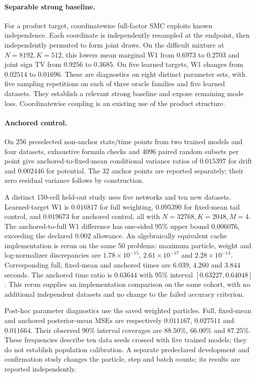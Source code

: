 \paragraph{Separable strong baseline.}
For a product target, coordinatewise full-factor SMC exploits known independence. Each coordinate is independently resampled at the endpoint, then independently permuted to form joint draws. On the difficult mixture at $N=8192,K=512$, this lowers mean marginal W1 from $0.6973$ to $0.2703$ and joint sign TV from $0.9256$ to $0.3685$. On five learned targets, W1 changes from $0.02514$ to $0.01696$. These are diagnostics on eight distinct parameter sets, with five sampling repetitions on each of three oracle families and five learned datasets. They establish a relevant strong baseline and expose remaining mode loss. Coordinatewise coupling is an existing use of the product structure.

\paragraph{Anchored control.}
On 256 preselected non-anchor state/time points from two trained models and four datasets, exhaustive formula checks and 4096 paired random subsets per point give anchored-to-fixed-mean conditional variance ratios of $0.015397$ for drift and $0.002446$ for potential. The 32 anchor points are reported separately; their zero residual variance follows by construction.

A distinct 150-cell held-out study uses five networks and ten new datasets. Learned-target W1 is $0.016817$ for full weighting, $0.095390$ for fixed-mean tail control, and $0.019673$ for anchored control, all with $N=32768,K=2048,M=4$. The anchored-to-full W1 difference has one-sided 95\% upper bound $0.006076$, exceeding the declared $0.002$ allowance. An algebraically equivalent cache implementation is rerun on the same 50 problems: maximum particle, weight and log-normalizer discrepancies are $1.78\times10^{-15}$, $2.61\times10^{-17}$ and $2.28\times10^{-13}$. Corresponding full, fixed-mean and anchored times are $6.039$, $4.260$ and $3.844$ seconds. The anchored time ratio is $0.63644$ with 95\% interval $[0.63227,0.64048]$. This rerun supplies an implementation comparison on the same cohort, with no additional independent datasets and no change to the failed accuracy criterion.

Post-hoc parameter diagnostics use the saved weighted particles. Full, fixed-mean and anchored posterior-mean MSEs are respectively $0.011167$, $0.027511$ and $0.011664$. Their observed 90\% interval coverages are $88.50\%$, $66.00\%$ and $87.25\%$. These frequencies describe ten data seeds crossed with five trained models; they do not establish population calibration. A separate predeclared development and confirmation study changes the particle, step and batch counts; its results are reported independently.

